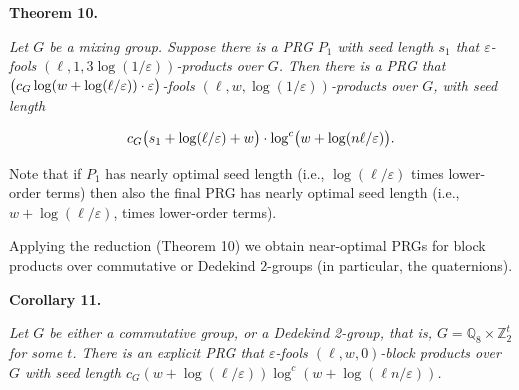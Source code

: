 

\par\medskip\noindent\textbf{
\textbf{Theorem 10}\textbf{.}
}\par



\emph{Let $G$ be a mixing group. Suppose there is
a PRG $P_{1}$ with seed length $s_{1}$ that $\varepsilon$-fools $(\ell,1,3\log(1/\varepsilon))$-products
over $G$. Then there is a PRG that $\bigl{(}c_{G}\log(w+\log(\ell/\varepsilon))\cdot\varepsilon\bigr{)}$-fools $(\ell,w,\log(1/\varepsilon))$-products
over $G$, with seed length}\par


\[\begin{gathered}
c_{G}\bigl{(}s_{1}+\log(\ell/\varepsilon)+w\bigr{)}\cdot\log^{c}\bigl{(}w+\log(n\ell/\varepsilon)\bigr{)}.
\end{gathered}\]






Note that if $P_{1}$ has nearly optimal seed length (i.e., $\log(\ell/\varepsilon)$
times lower-order terms) then also the final PRG has nearly optimal
seed length (i.e., $w+\log(\ell/\varepsilon)$, times lower-order terms).\par




Applying the reduction (Theorem 10) we obtain near-optimal
PRGs for block products over commutative or Dedekind $2$-groups (in
particular, the quaternions).\par





\par\medskip\noindent\textbf{
\textbf{Corollary 11}\textbf{.}
}\par



\emph{Let $G$ be either a commutative group, or a Dedekind
2-group, that is, $G=\mathbb{Q}_{8}\times\mathbb{Z}_{2}^{t}$ for
some $t$. There is an explicit PRG that $\varepsilon$-fools $(\ell,w,0)$-block products over $G$
with seed length $c_{G}(w+\log(\ell/\varepsilon))\log^{c}(w+\log(\ell n/\varepsilon))$.}\par







